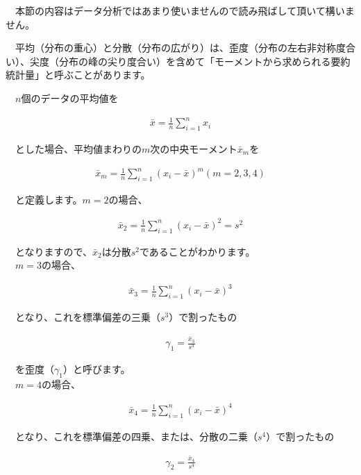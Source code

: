 \documentclass[
  12pt,
]{book}
\begin{document}
　本節の内容はデータ分析ではあまり使いませんので読み飛ばして頂いて構いません。

　平均（分布の重心）と分散（分布の広がり）は、歪度（分布の左右非対称度合い）、尖度（分布の峰の尖り度合い）を含めて「モーメントから求められる要約統計量」と呼ぶことがあります。

　\(n\)個のデータの平均値を

\begin{align}
  \bar{x} = \frac{1}{n}\sum_{i = 1}^{n}x_i \label{eq:moment1}
\end{align}

　とした場合、平均値まわりの\(m\)次の中央モーメント\(\bar{x}_m\)を

\begin{align}
  \bar{x}_m = \frac{1}{n}\sum_{i = 1}^{n}(x_i - \bar{x})^m　　(m = 2, 3, 4) \label{eq:moment}
\end{align}

　と定義します。\(m = 2\)の場合、

\begin{align}
  \bar{x}_2 = \frac{1}{n}\sum_{i = 1}^{n}(x_i - \bar{x})^2 = s^2 \label{eq:moment2}
\end{align}

　となりますので、\(\bar{x}_2\)は分散\(s^2\)であることがわかります。\\
　\(m = 3\)の場合、

\begin{align}
  \bar{x}_3 = \frac{1}{n}\sum_{i = 1}^{n}(x_i - \bar{x})^3 \label{eq:moment3}
\end{align}

　となり、これを標準偏差の三乗（\(s^3\)）で割ったもの

\begin{align}
  \gamma_1 = \frac{\bar{x}_3}{s^3} \label{eq:skewness}
\end{align}

　を歪度（\(\gamma_1\)）と呼びます。\\
　\(m = 4\)の場合、

\begin{align}
  \bar{x}_4 = \frac{1}{n}\sum_{i = 1}^{n}(x_i - \bar{x})^4  \label{eq:moment4}
\end{align}

　となり、これを標準偏差の四乗、または、分散の二乗（\(s^4\)）で割ったもの

\begin{align}
  \gamma_2 = \frac{\bar{x}_4}{s^4} \label{eq:kurtosise}
\end{align}
\end{document}
